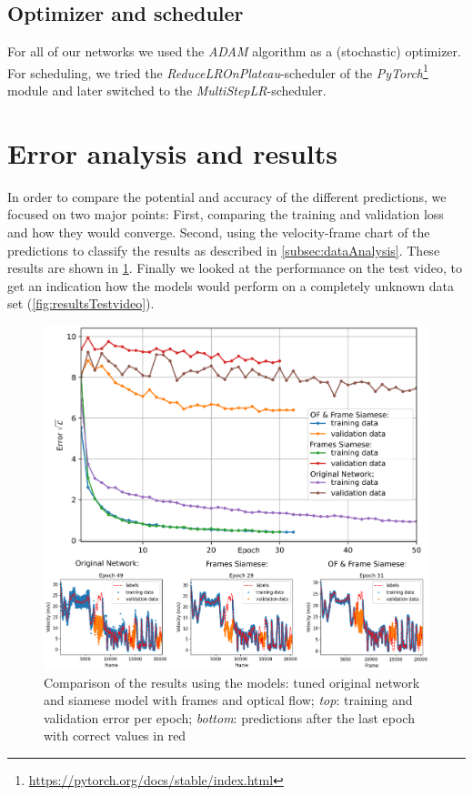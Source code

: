 \documentclass[conference]{IEEEtran}
\begin{document}
\subsection{Optimizer and scheduler}
For all of our networks we used the \emph{ADAM} \cite{Adam2014} algorithm as a (stochastic) optimizer. 
For scheduling, we tried the \emph{ReduceLROnPlateau}-scheduler of the \emph{PyTorch}\footnote{
\url{https://pytorch.org/docs/stable/index.html}} module and later
switched to the \emph{MultiStepLR}-scheduler.

\section{Error analysis and results}
In order to compare the potential and accuracy of the different predictions, we focused on two major points: First, comparing the training and validation loss and how they would converge. Second, 
using the velocity-frame chart of the predictions to classify the results as described in \cref{subsec:dataAnalysis}. These results are shown in \cref{fig:resultsSummary}. Finally we looked at the 
performance on the test video, to get an indication how the models would perform on a completely unknown data set (\cref{fig:resultsTestvideo}).

\begin{figure}[ht]
	\centering
	\includegraphics[width=0.99\columnwidth]{imgs/TrainingProcess.eps}
	\caption{Comparison of the results using the models: tuned original network and siamese model with frames and optical flow; \textit{top}: training and validation error per epoch; 
	\emph{bottom}: predictions after the last epoch with correct values in red}
	\label{fig:resultsSummary}
\end{figure}
\end{document}
